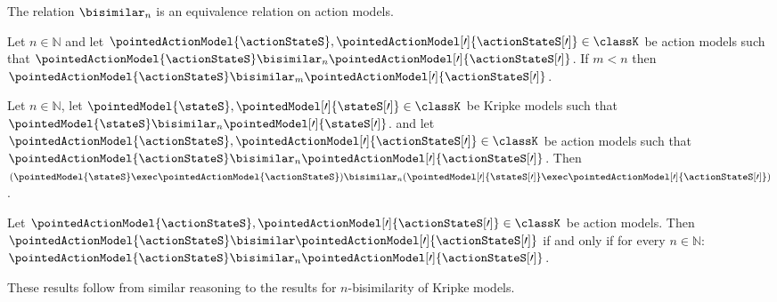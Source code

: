 \documentclass[twoside]{aiml14}
\begin{document}
  \begin{proposition}
      The relation $\bisimilar_n$ is an equivalence relation on action models.
  \end{proposition}

  \begin{proposition}
      Let $n \in \mathbb{N}$ and 
      let $\pointedActionModel{\actionStateS}, \pointedActionModel[\prime]{\actionStateS[\prime]} \in \classK$ be action models 
      such that $\pointedActionModel{\actionStateS} \bisimilar_n \pointedActionModel[\prime]{\actionStateS[\prime]}$. 
      If $m < n$ then $\pointedActionModel{\actionStateS} \bisimilar_m \pointedActionModel[\prime]{\actionStateS[\prime]}$. 
  \end{proposition}

  \begin{proposition}
      Let $n \in \mathbb{N}$,
      let $\pointedModel{\stateS}, \pointedModel[\prime]{\stateS[\prime]} \in \classK$ be Kripke models such that
      $\pointedModel{\stateS} \bisimilar_n \pointedModel[\prime]{\stateS[\prime]}$. 
      and let $\pointedActionModel{\actionStateS}, \pointedActionModel[\prime]{\actionStateS[\prime]} \in \classK$ be action models such that
      $\pointedActionModel{\actionStateS} \bisimilar_n \pointedActionModel[\prime]{\actionStateS[\prime]}$.
      Then
      $(\pointedModel{\stateS} \exec \pointedActionModel{\actionStateS}) \bisimilar_n (\pointedModel[\prime]{\stateS[\prime]} \exec \pointedActionModel[\prime]{\actionStateS[\prime]})$.
  \end{proposition}

  \begin{proposition}
      Let $\pointedActionModel{\actionStateS}, \pointedActionModel[\prime]{\actionStateS[\prime]} \in \classK$ be action models.
      Then $\pointedActionModel{\actionStateS} \bisimilar \pointedActionModel[\prime]{\actionStateS[\prime]}$
      if and only if for every $n \in \mathbb{N}$: 
      $\pointedActionModel{\actionStateS} \bisimilar_n \pointedActionModel[\prime]{\actionStateS[\prime]}$.
  \end{proposition}

  These results follow from similar reasoning to the results for $n$-bisimilarity of Kripke models.
\end{document}
